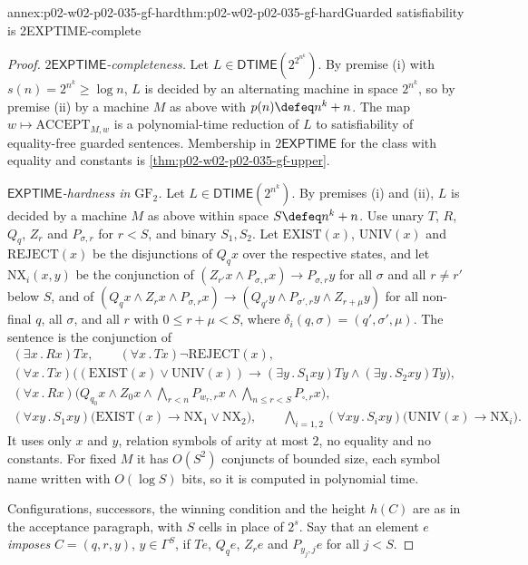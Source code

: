 \begin{annexitem}{annex:p02-w02-p02-035-gf-hard}{thm:p02-w02-p02-035-gf-hard}{Guarded satisfiability is 2EXPTIME-complete}
\begin{proof}
\emph{\(2\mathsf{EXPTIME}\)-completeness.}  Let
\(L\in\mathsf{DTIME}(2^{2^{n^k}})\).  By premise (i) with
\(s(n)=2^{n^k}\geq\log n\), \(L\) is decided by an alternating machine in
space \(2^{n^k}\), so by premise (ii) by a machine \(M\) as above with
\(p(n)\defeq n^k+n\).  The map \(w\mapsto\mathrm{ACCEPT}_{M,w}\) is a
polynomial-time reduction of \(L\) to satisfiability of equality-free
guarded sentences.  Membership in \(2\mathsf{EXPTIME}\) for the class with
equality and constants is \cref{thm:p02-w02-p02-035-gf-upper}.

\emph{\(\mathsf{EXPTIME}\)-hardness in \(\mathrm{GF}_2\).}  Let
\(L\in\mathsf{DTIME}(2^{n^k})\).  By premises (i) and (ii), \(L\) is decided
by a machine \(M\) as above within space \(S\defeq n^k+n\).  Use unary \(T\),
\(R\), \(Q_q\), \(Z_r\) and \(P_{\sigma,r}\) for \(r<S\), and binary
\(S_1,S_2\).  Let \(\mathrm{EXIST}(x)\), \(\mathrm{UNIV}(x)\) and
\(\mathrm{REJECT}(x)\) be the disjunctions of \(Q_qx\) over the respective
states, and let \(\mathrm{NX}_i(x,y)\) be the conjunction of
\((Z_{r'}x\land P_{\sigma,r}x)\to P_{\sigma,r}y\) for all \(\sigma\) and all
\(r\neq r'\) below \(S\), and of
\((Q_qx\land Z_rx\land P_{\sigma,r}x)\to(Q_{q'}y\land P_{\sigma',r}y\land Z_{r+\mu}y)\)
for all non-final \(q\), all \(\sigma\), and all \(r\) with \(0\leq r+\mu<S\),
where \(\delta_i(q,\sigma)=(q',\sigma',\mu)\).  The sentence is the conjunction
of
\[
\begin{gathered}
 (\exists x\,.\,Rx)Tx,\qquad
 (\forall x\,.\,Tx)\neg\mathrm{REJECT}(x),\\
 (\forall x\,.\,Tx)\bigl((\mathrm{EXIST}(x)\lor\mathrm{UNIV}(x))\to
  (\exists y\,.\,S_1xy)Ty\land(\exists y\,.\,S_2xy)Ty\bigr),\\
 (\forall x\,.\,Rx)\bigl(Q_{q_0}x\land Z_0x\land
  \textstyle\bigwedge_{r<n}P_{w_r,r}x\land\bigwedge_{n\leq r<S}P_{\square,r}x\bigr),\\
 (\forall xy\,.\,S_1xy)\bigl(\mathrm{EXIST}(x)\to\mathrm{NX}_1\lor\mathrm{NX}_2\bigr),\qquad
 \textstyle\bigwedge_{i=1,2}(\forall xy\,.\,S_ixy)\bigl(\mathrm{UNIV}(x)\to\mathrm{NX}_i\bigr).
\end{gathered}
\]
It uses only \(x\) and \(y\), relation symbols of arity at most \(2\), no
equality and no constants.  For fixed \(M\) it has \(O(S^2)\) conjuncts of
bounded size, each symbol name written with \(O(\log S)\) bits, so it is
computed in polynomial time.

Configurations, successors, the winning condition and the height \(h(C)\)
are as in the acceptance paragraph, with \(S\) cells in place of \(2^{s}\).
Say that an element \(e\) \emph{imposes} \(C=(q,r,y)\), \(y\in\Gamma^{S}\), if
\(Te\), \(Q_qe\), \(Z_re\) and \(P_{y_j,j}e\) for all \(j<S\).


\end{proof}
\end{annexitem}

